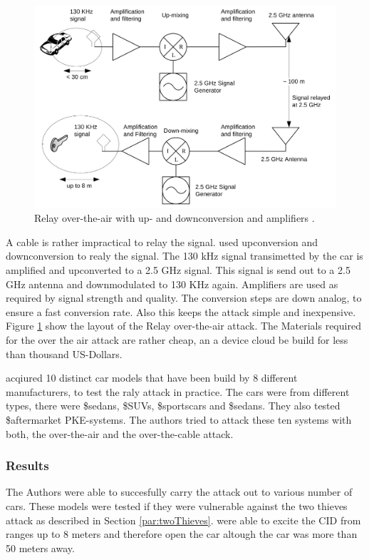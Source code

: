 	\begin{figure}[htb]
		\begin{center}
			\includegraphics[width=\textwidth]{pictures/franc_relay_over_the_air.png}
		\end{center}
		\caption{Relay over-the-air with up- and downconversion and amplifiers \citep[p. 6]{relayAttacksFranc}.}
		\label{fig:relayOTA}
	\end{figure}
	A cable is rather impractical to relay the signal.
	\citeauthor{relayAttacksFranc} used upconversion and downconversion to realy the signal.
	The 130 kHz signal transimetted by the car is amplified and upconverted to a 2.5 GHz signal.
	This signal is send out to a 2.5 GHz antenna and downmodulated to 130 KHz again.
	Amplifiers are used as required by signal strength and quality.
	The conversion steps are down analog,
	to ensure a fast conversion rate.
	Also this keeps the attack simple and inexpensive.
	Figure \ref{fig:relayOTA} show the layout of the Relay over-the-air attack.
	The Materials required for the over the air attack are rather cheap,
	an a device cloud be build for less than thousand US-Dollars.  %

	\citeauthor{relayAttacksFranc} acqiured 10 distinct car models that have been build by 8 different manufacturers,
	to test the raly attack in practice.
	The cars were from different types,
	there were \$sedans, \$SUVs, \$sportscars  and \$sedans.
	They also tested \$aftermarket PKE-systems.
	The authors tried to attack these ten systems with both,
	the over-the-air and the over-the-cable attack.

\subsubsection*{Results}
	The Authors were able to succesfully carry the attack out to various number of cars.
	These models were tested if they were vulnerable against the two thieves attack as described in 
	Section \ref{par:twoThieves}.
	\citeauthor{relayAttacksFranc} were able to excite the CID from ranges up to 8 meters
	and therefore open the car altough the car was more than 50 meters away.


